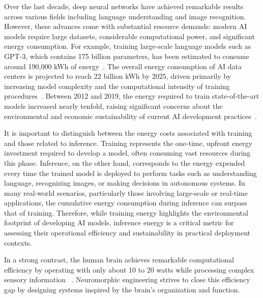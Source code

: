 Over the last decade, deep neural networks have achieved remarkable results across various fields including language understanding and image recognition. However, these advances come with substantial resource demands: modern AI models require large datasets, considerable computational power, and significant energy consumption. For example, training large-scale language models such as GPT-3, which contains 175 billion parameters, has been estimated to consume around 190,000 kWh of energy~\cite{brown2020gpt3}. The overall energy consumption of AI data centers is projected to reach 22 billion kWh by 2025, driven primarily by increasing model complexity and the computational intensity of training procedures~\cite{tuml2025energy}. Between 2012 and 2019, the energy required to train state-of-the-art models increased nearly tenfold, raising significant concerns about the environmental and economic sustainability of current AI development practices~\cite{delrey2023energy}.

It is important to distinguish between the energy costs associated with training and those related to inference. Training represents the one-time, upfront energy investment required to develop a model, often consuming vast resources during this phase. Inference, on the other hand, corresponds to the energy expended every time the trained model is deployed to perform tasks such as understanding language, recognizing images, or making decisions in autonomous systems. In many real-world scenarios, particularly those involving large-scale or real-time applications, the cumulative energy consumption during inference can surpass that of training. Therefore, while training energy highlights the environmental footprint of developing AI models, inference energy is a critical metric for assessing their operational efficiency and sustainability in practical deployment contexts.

In a strong contrast, the human brain achieves remarkable computational efficiency by operating with only about 10 to 20 watts while processing complex sensory information ~\cite{muir2025road}. Neuromorphic engineering strives to close this efficiency gap by designing systems inspired by the brain’s organization and function.

